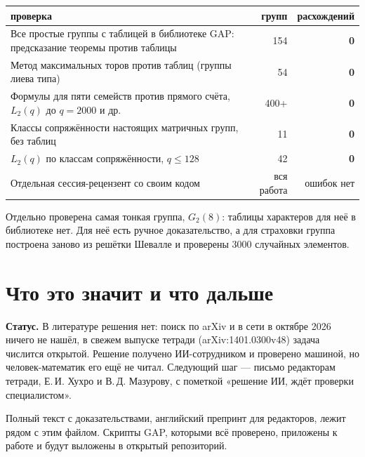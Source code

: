 \documentclass[11pt,a4paper]{article}
\begin{document}
\begin{center}\small
\begin{tabularx}{\linewidth}{@{}>{\raggedright\arraybackslash}X r r@{}}\toprule
проверка & групп & расхождений \\\midrule
Все простые группы с таблицей в библиотеке GAP: предсказание теоремы против таблицы & 154 & \textbf{0} \\
Метод максимальных торов против таблиц (группы лиева типа) & 54 & \textbf{0} \\
Формулы для пяти семейств против прямого счёта, $L_2(q)$ до $q=2000$ и др. & 400+ & \textbf{0} \\
Классы сопряжённости настоящих матричных групп, без таблиц & 11 & \textbf{0} \\
$L_2(q)$ по классам сопряжённости, $q\le128$ & 42 & \textbf{0} \\
Отдельная сессия-рецензент со своим кодом & вся работа & ошибок нет \\\bottomrule
\end{tabularx}
\end{center}

Отдельно проверена самая тонкая группа, $G_2(8)$: таблицы характеров для неё в библиотеке нет. Для неё есть ручное доказательство, а для страховки группа построена заново из решётки Шевалле и проверены 3000 случайных элементов.

\section{Что это значит и что дальше}

\begin{notebox}
\textbf{Статус.} В литературе решения нет: поиск по arXiv и в сети в октябре 2026 ничего не нашёл, в свежем выпуске тетради (arXiv:1401.0300v48) задача числится открытой. Решение получено ИИ-сотрудником и проверено машиной, но человек-математик его ещё не читал. Следующий шаг — письмо редакторам тетради, Е.\,И. Хухро и В.\,Д. Мазурову, с пометкой «решение ИИ, ждёт проверки специалистом».
\end{notebox}

Полный текст с доказательствами, английский препринт для редакторов, лежит рядом с этим файлом. Скрипты GAP, которыми всё проверено, приложены к работе и будут выложены в открытый репозиторий.
\end{document}
